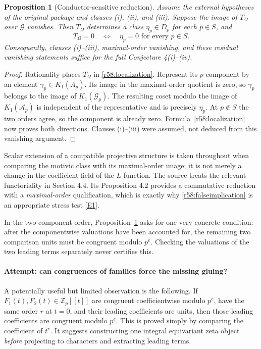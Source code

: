 \documentclass[11pt,a4paper]{article}
\newcommand{\Z}{\mathbb{Z}}
\newcommand{\eref}[2]{\hyperlink{extra:#1:#2}{[E#2]}}
\newtheorem{notebookproposition}[notebooklemma]{Proposition}
\numberwithin{equation}{section}
\begin{document}
\begin{notebookproposition}[Conductor-sensitive reduction]\label{r58:reduction}
Assume the external hypotheses of the original package and clauses (i), (ii), and (iii). Suppose the image of $T_\Omega$ over $\mathcal G$ vanishes. Then $T_\Omega$ determines a class $\eta_p\in D_p$ for each $p\in S$, and
\[
 T_\Omega=0\quad\Longleftrightarrow\quad
                \eta_p=0\text{ for every }p\in S.
\]
Consequently, clauses (i)--(iii), maximal-order vanishing, and these residual vanishing statements suffice for the \emph{full} Conjecture 4(i)--(iv).
\end{notebookproposition}
\begin{proof}
Rationality places $T_\Omega$ in \eqref{r58:localization}. Represent its $p$-component by an element $\gamma_p\in K_1(A_p)$. Its image in the maximal-order quotient is zero, so $\gamma_p$ belongs to the image of $K_1(\mathcal G_p)$. The resulting coset modulo the image of $K_1(\mathcal A_p)$ is independent of the representative and is precisely $\eta_p$. At $p\notin S$ the two orders agree, so the component is already zero. Formula~\eqref{r58:localization} now proves both directions. Clauses (i)--(iii) were assumed, not deduced from this vanishing argument.
\end{proof}

Scalar extension of a compatible projective structure is taken throughout when comparing the motivic class with its maximal-order image; it is not merely a change in the coefficient field of the $L$-function. The source treats the relevant functoriality in Section 4.4. Its Proposition 4.2 provides a commutative reduction with a \emph{maximal-order} qualification, which is exactly why \eqref{r58:falseimplication} is an appropriate stress test \eref{30006700}{1}.

In the two-component order, Proposition~\ref{r58:reduction} asks for one very concrete condition: after the componentwise valuations have been accounted for, the remaining two comparison units must be congruent modulo $p^e$. Checking the valuations of the two leading terms separately never certifies this.

\paragraph{Attempt: can congruences of families force the missing gluing?}
A potentially useful but limited observation is the following. If
$F_1(t),F_2(t)\in\Z_p[[t]]$ are congruent coefficientwise modulo $p^e$, have the same order $r$ at $t=0$, and their leading coefficients are units, then those leading coefficients are congruent modulo $p^e$. This is proved simply by comparing the coefficient of $t^r$. It suggests constructing one integral equivariant zeta object \emph{before} projecting to characters and extracting leading terms.
\end{document}

